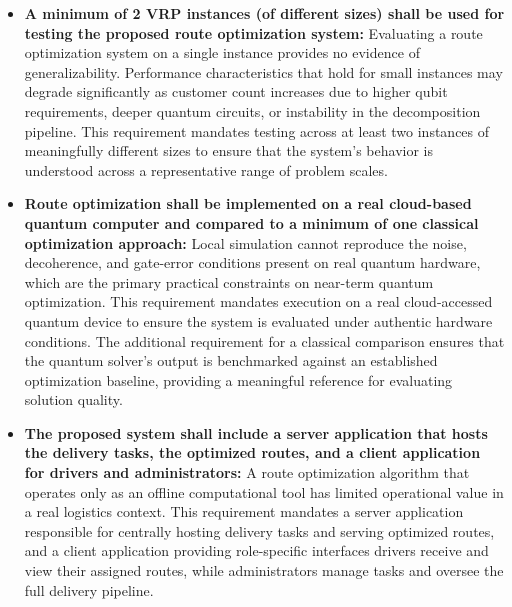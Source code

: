 \documentclass[a4paper]{report}
\begin{document}
{\begin{itemize}
\begin{itemize}
  \item \textbf{A minimum of 2 VRP instances (of different sizes) shall be
  used for testing the proposed route optimization system:}
  Evaluating a route optimization system on a single instance provides no
  evidence of generalizability. Performance characteristics that hold for small
  instances may degrade significantly as customer count increases due to higher
  qubit requirements, deeper quantum circuits, or instability in the
  decomposition pipeline. This requirement mandates testing across at least two
  instances of meaningfully different sizes to ensure that the system's behavior
  is understood across a representative range of problem scales.

  \item \textbf{Route optimization shall be implemented on a real cloud-based
  quantum computer and compared to a minimum of one classical optimization
  approach:}
  Local simulation cannot reproduce the noise, decoherence, and gate-error
  conditions present on real quantum hardware, which are the primary practical
  constraints on near-term quantum optimization. This requirement mandates
  execution on a real cloud-accessed quantum device to ensure the system is
  evaluated under authentic hardware conditions. The additional requirement for
  a classical comparison ensures that the quantum solver's output is benchmarked
  against an established optimization baseline, providing a meaningful reference
  for evaluating solution quality.

  \item \textbf{The proposed system shall include a server application that
  hosts the delivery tasks, the optimized routes, and a client application
  for drivers and administrators:}
  A route optimization algorithm that operates only as an offline computational
  tool has limited operational value in a real logistics context. This
  requirement mandates a server application responsible for centrally hosting
  delivery tasks and serving optimized routes, and a client application
  providing role-specific interfaces drivers receive and view their assigned
  routes, while administrators manage tasks and oversee the full delivery
  pipeline.


\end{itemize}
\end{itemize}}
\end{document}
